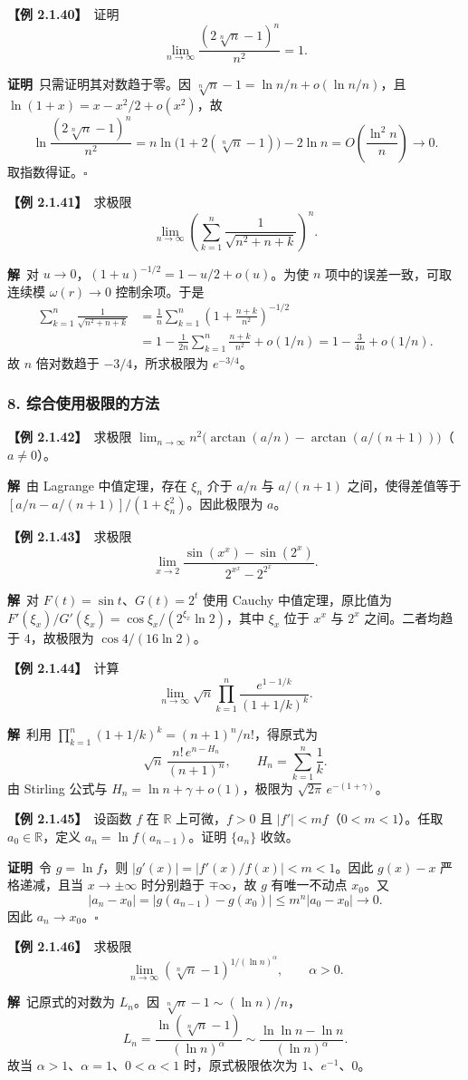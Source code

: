 \documentclass[UTF8,a4paper,11pt]{ctexart}
\newcommand{\ex}[1]{\par\medskip\noindent\textbf{【例 #1】}\ }
\newcommand{\pf}{\par\noindent\textbf{证明}\ }
\newcommand{\sol}{\par\noindent\textbf{解}\ }
\begin{document}
\ex{2.1.40}证明
\[
\lim_{n\to\infty}\frac{(2\sqrt[n]{n}-1)^n}{n^2}=1.
\]
\pf 只需证明其对数趋于零。因 $\sqrt[n]{n}-1=\ln n/n+o(\ln n/n)$，且 $\ln(1+x)=x-x^2/2+o(x^2)$，故
\[
\ln\frac{(2\sqrt[n]{n}-1)^n}{n^2}
=n\ln\bigl(1+2(\sqrt[n]{n}-1)\bigr)-2\ln n
=O\!\left(\frac{\ln^2 n}{n}\right)\to0.
\]
取指数得证。\hfill$\square$

\ex{2.1.41}求极限
\[
\lim_{n\to\infty}\left(\sum_{k=1}^{n}\frac1{\sqrt{n^2+n+k}}\right)^n.
\]
\sol 对 $u\to0$，$(1+u)^{-1/2}=1-u/2+o(u)$。为使 $n$ 项中的误差一致，可取连续模 $\omega(r)\to0$ 控制余项。于是
\begin{align*}
\sum_{k=1}^{n}\frac1{\sqrt{n^2+n+k}}
&=\frac1n\sum_{k=1}^{n}\left(1+\frac{n+k}{n^2}\right)^{-1/2}\\
&=1-\frac1{2n}\sum_{k=1}^{n}\frac{n+k}{n^2}+o(1/n)
=1-\frac{3}{4n}+o(1/n).
\end{align*}
故 $n$ 倍对数趋于 $-3/4$，所求极限为 $e^{-3/4}$。

\subsubsection*{8. 综合使用极限的方法}
\ex{2.1.42}求极限 $\lim_{n\to\infty}n^2\bigl(\arctan(a/n)-\arctan(a/(n+1))\bigr)$（$a\ne0$）。
\sol 由 Lagrange 中值定理，存在 $\xi_n$ 介于 $a/n$ 与 $a/(n+1)$ 之间，使得差值等于 $[a/n-a/(n+1)]/(1+\xi_n^2)$。因此极限为 $a$。

\ex{2.1.43}求极限
\[
\lim_{x\to2}\frac{\sin(x^x)-\sin(2^x)}{2^{x^x}-2^{2^x}}.
\]
\sol 对 $F(t)=\sin t$、$G(t)=2^t$ 使用 Cauchy 中值定理，原比值为 $F'(\xi_x)/G'(\xi_x)=\cos\xi_x/(2^{\xi_x}\ln2)$，其中 $\xi_x$ 位于 $x^x$ 与 $2^x$ 之间。二者均趋于 $4$，故极限为 $\cos4/(16\ln2)$。

\ex{2.1.44}计算
\[
\lim_{n\to\infty}\sqrt n\prod_{k=1}^{n}\frac{e^{1-1/k}}{(1+1/k)^k}.
\]
\sol 利用 $\prod_{k=1}^{n}(1+1/k)^k=(n+1)^n/n!$，得原式为
\[
\sqrt n\,\frac{n!\,e^{n-H_n}}{(n+1)^n},\qquad H_n=\sum_{k=1}^{n}\frac1k.
\]
由 Stirling 公式与 $H_n=\ln n+\gamma+o(1)$，极限为 $\sqrt{2\pi}\,e^{-(1+\gamma)}$。

\ex{2.1.45}设函数 $f$ 在 $\mathbb R$ 上可微，$f>0$ 且 $|f'|<mf$（$0<m<1$）。任取 $a_0\in\mathbb R$，定义 $a_n=\ln f(a_{n-1})$。证明 $\{a_n\}$ 收敛。
\pf 令 $g=\ln f$，则 $|g'(x)|=|f'(x)/f(x)|<m<1$。因此 $g(x)-x$ 严格递减，且当 $x\to\pm\infty$ 时分别趋于 $\mp\infty$，故 $g$ 有唯一不动点 $x_0$。又
\[
|a_n-x_0|=|g(a_{n-1})-g(x_0)|\le m^n|a_0-x_0|\to0.
\]
因此 $a_n\to x_0$。\hfill$\square$

\ex{2.1.46}求极限
\[
\lim_{n\to\infty}(\sqrt[n]{n}-1)^{1/(\ln n)^\alpha},\qquad \alpha>0.
\]
\sol 记原式的对数为 $L_n$。因 $\sqrt[n]{n}-1\sim(\ln n)/n$，
\[
L_n=\frac{\ln(\sqrt[n]{n}-1)}{(\ln n)^\alpha}
\sim\frac{\ln\ln n-\ln n}{(\ln n)^\alpha}.
\]
故当 $\alpha>1$、$\alpha=1$、$0<\alpha<1$ 时，原式极限依次为 $1$、$e^{-1}$、$0$。
\end{document}
